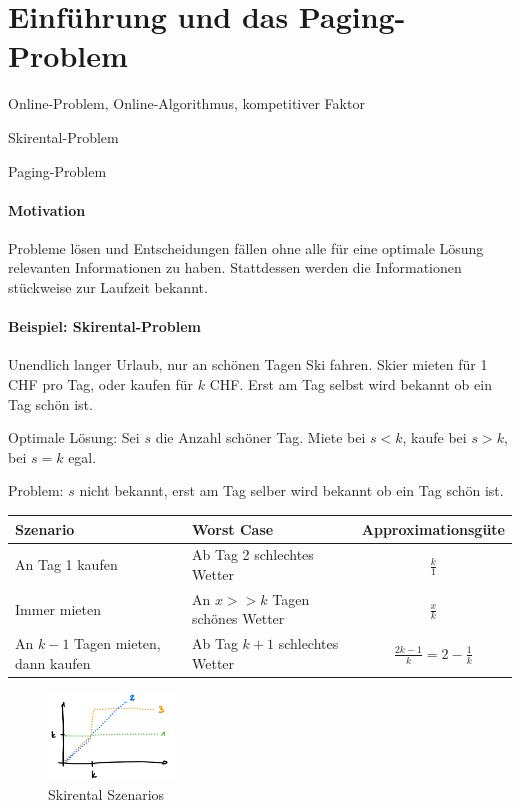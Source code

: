 \section{Einführung und das Paging-Problem}

\begin{takeaway}
    \item Online-Problem, Online-Algorithmus, kompetitiver Faktor
    \item Skirental-Problem
    \item Paging-Problem
\end{takeaway}

\paragraph{Motivation}
Probleme lösen und Entscheidungen fällen ohne alle für eine optimale Lösung relevanten Informationen zu haben.
Stattdessen werden die Informationen stückweise zur Laufzeit bekannt.

\paragraph{Beispiel: Skirental-Problem}
Unendlich langer Urlaub, nur an schönen Tagen Ski fahren.
Skier mieten für 1 CHF pro Tag, oder kaufen für $k$ CHF.
Erst am Tag selbst wird bekannt ob ein Tag schön ist.

Optimale Lösung: Sei $s$ die Anzahl schöner Tag.
Miete bei $s < k$, kaufe bei $s > k$, bei $s=k$ egal.

Problem: $s$ nicht bekannt, erst am Tag selber wird bekannt ob ein Tag schön ist.

\begin{table}[h]
    \begin{tabular}{l|l|c}
        Szenario & Worst Case & Approximationsgüte \\ \hline
        An Tag 1 kaufen & Ab Tag 2 schlechtes Wetter & $\frac{k}{1}$ \\
        Immer mieten & An $x >> k$ Tagen schönes Wetter & $\frac{x}{k}$ \\
        An $k-1$ Tagen mieten, dann kaufen & Ab Tag $k+1$ schlechtes Wetter & $\frac{2k-1}{k} = 2-\frac{1}{k}$
    \end{tabular}
\end{table}
\begin{figure}[h]
    \centering
    \includegraphics[width=0.3\textwidth]{images/skirental.png}
    \caption{Skirental Szenarios}
\end{figure}

